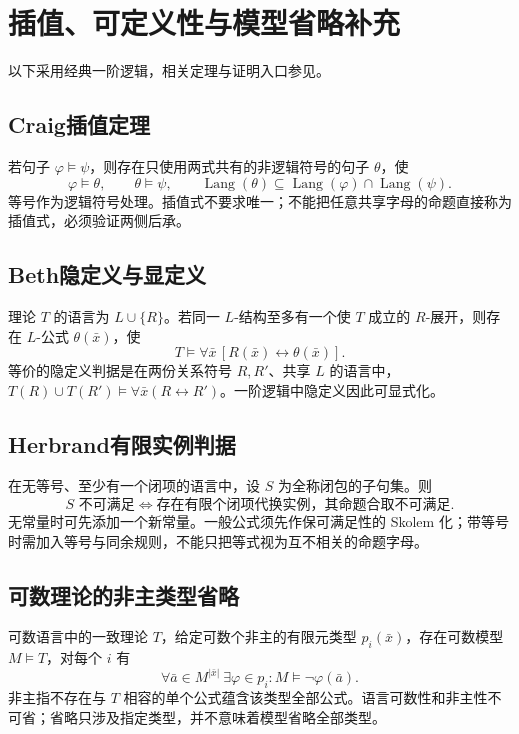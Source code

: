 \documentclass[../main.tex]{subfiles}
\begin{document}
\section{插值、可定义性与模型省略补充}
以下采用经典一阶逻辑，相关定理与证明入口参见\cite{freund}。
\subsection{Craig插值定理}
若句子 $\varphi\models\psi$，则存在只使用两式共有的非逻辑符号的句子 $\theta$，使
\[
\varphi\models\theta,\qquad\theta\models\psi,\qquad
\operatorname{Lang}(\theta)\subseteq
\operatorname{Lang}(\varphi)\cap\operatorname{Lang}(\psi).
\]
等号作为逻辑符号处理。插值式不要求唯一；不能把任意共享字母的命题直接称为插值式，必须验证两侧后承。
\subsection{Beth隐定义与显定义}
理论 $T$ 的语言为 $L\cup\{R\}$。若同一 $L$-结构至多有一个使 $T$ 成立的 $R$-展开，则存在 $L$-公式 $\theta(\bar x)$，使
\[
T\models\forall\bar x\,[R(\bar x)\leftrightarrow\theta(\bar x)].
\]
等价的隐定义判据是在两份关系符号 $R,R'$、共享 $L$ 的语言中，$T(R)\cup T(R')\models\forall\bar x(R\leftrightarrow R')$。一阶逻辑中隐定义因此可显式化。
\subsection{Herbrand有限实例判据}
在无等号、至少有一个闭项的语言中，设 $S$ 为全称闭包的子句集。则
\[
S\text{ 不可满足}\iff
\text{存在有限个闭项代换实例，其命题合取不可满足}.
\]
无常量时可先添加一个新常量。一般公式须先作保可满足性的 Skolem 化；带等号时需加入等号与同余规则，不能只把等式视为互不相关的命题字母。
\subsection{可数理论的非主类型省略}
可数语言中的一致理论 $T$，给定可数个非主的有限元类型 $p_i(\bar x)$，存在可数模型 $M\models T$，对每个 $i$ 有
\[
\forall\bar a\in M^{|\bar x|}\ \exists\varphi\in p_i:
M\models\neg\varphi(\bar a).
\]
非主指不存在与 $T$ 相容的单个公式蕴含该类型全部公式。语言可数性和非主性不可省；省略只涉及指定类型，并不意味着模型省略全部类型。
\clearpage
\end{document}

